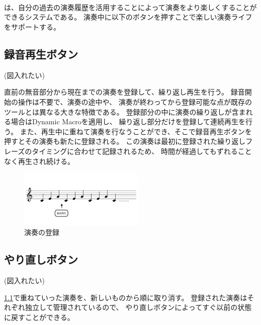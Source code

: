 \section{\system}
\label{repiano}

{\system}は、自分の過去の演奏履歴を活用することによって演奏をより楽しくすることができるシステムである。
演奏中に以下のボタンを押すことで楽しい演奏ライフをサポートする。

\subsection{録音再生ボタン}
\label{recplaybutton}
(図入れたい)

直前の無音部分から現在までの演奏を登録して、繰り返し再生を行う。
録音開始の操作は不要で、演奏の途中や、
演奏が終わってから登録可能な点が既存のツールとは異なる大きな特徴である。
登録部分の中に演奏の繰り返しが含まれる場合はDynamic Macro\cite{masui}を適用し、
繰り返し部分だけを登録して連続再生を行う。
また、再生中に重ねて演奏を行なうことができ、そこで録音再生ボタンを押すとその演奏も新たに登録される。
この演奏は最初に登録された繰り返しフレーズのタイミングに合わせて記録されるため、
時間が経過してもずれることなく再生され続ける。

\begin{figure}[tb]
\includegraphics[width=6cm,bb=0 0 1054 481]{rp1.png}
\caption{演奏の登録}
\label{recplay1}
\end{figure}

\subsection{やり直しボタン}
(図入れたい)

\ref{recplaybutton}で重ねていった演奏を、新しいものから順に取り消す。
登録された演奏はそれぞれ独立して管理されているので、
やり直しボタンによってすぐ以前の状態に戻すことができる。
